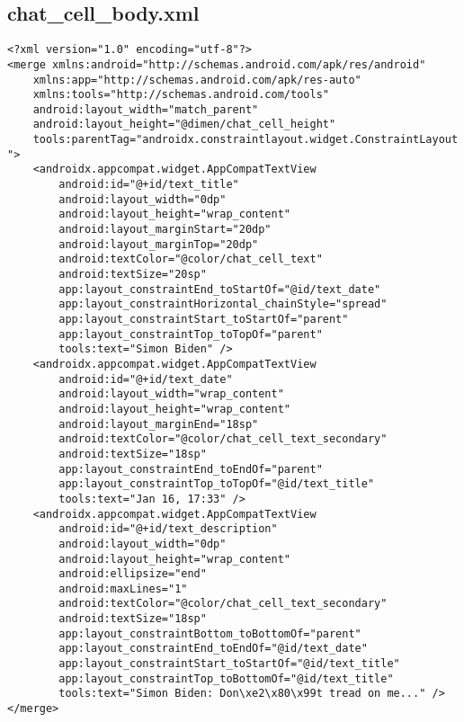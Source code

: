 \documentclass[listing]{espd}
\begin{document}
\subsection{chat\_cell\_body.xml}
\begin{verbatim}
<?xml version="1.0" encoding="utf-8"?>
<merge xmlns:android="http://schemas.android.com/apk/res/android"
    xmlns:app="http://schemas.android.com/apk/res-auto"
    xmlns:tools="http://schemas.android.com/tools"
    android:layout_width="match_parent"
    android:layout_height="@dimen/chat_cell_height"
    tools:parentTag="androidx.constraintlayout.widget.ConstraintLayout
">
    <androidx.appcompat.widget.AppCompatTextView
        android:id="@+id/text_title"
        android:layout_width="0dp"
        android:layout_height="wrap_content"
        android:layout_marginStart="20dp"
        android:layout_marginTop="20dp"
        android:textColor="@color/chat_cell_text"
        android:textSize="20sp"
        app:layout_constraintEnd_toStartOf="@id/text_date"
        app:layout_constraintHorizontal_chainStyle="spread"
        app:layout_constraintStart_toStartOf="parent"
        app:layout_constraintTop_toTopOf="parent"
        tools:text="Simon Biden" />
    <androidx.appcompat.widget.AppCompatTextView
        android:id="@+id/text_date"
        android:layout_width="wrap_content"
        android:layout_height="wrap_content"
        android:layout_marginEnd="18sp"
        android:textColor="@color/chat_cell_text_secondary"
        android:textSize="18sp"
        app:layout_constraintEnd_toEndOf="parent"
        app:layout_constraintTop_toTopOf="@id/text_title"
        tools:text="Jan 16, 17:33" />
    <androidx.appcompat.widget.AppCompatTextView
        android:id="@+id/text_description"
        android:layout_width="0dp"
        android:layout_height="wrap_content"
        android:ellipsize="end"
        android:maxLines="1"
        android:textColor="@color/chat_cell_text_secondary"
        android:textSize="18sp"
        app:layout_constraintBottom_toBottomOf="parent"
        app:layout_constraintEnd_toEndOf="@id/text_date"
        app:layout_constraintStart_toStartOf="@id/text_title"
        app:layout_constraintTop_toBottomOf="@id/text_title"
        tools:text="Simon Biden: Don\xe2\x80\x99t tread on me..." />
</merge>
\end{verbatim}
\end{document}
